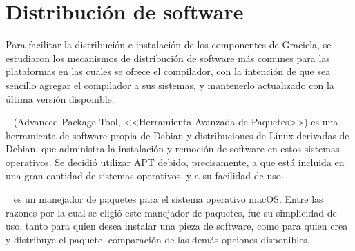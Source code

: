 \section{Distribución de software}

Para facilitar la distribución e instalación de los componentes de Graciela, se
estudiaron los mecanismos de distribución de software más comunes para las
plataformas en las cuales se ofrece el compilador, con la intención de que sea
sencillo agregar el compilador a sus sistemas, y mantenerlo actualizado con la
última versión disponible.

\begin{description}[leftmargin=!,labelwidth=\widthof{\bfseries Homebrew}]

\item [APT]~\cite{apt} (Advanced Package Tool, <<Herramienta Avanzada de
Paquetes>>) es una herramienta de software propia de Debian y distribuciones de
Linux derivadas de Debian, que administra la instalación y remoción de software
en estos sistemas operativos. Se decidió utilizar APT debido, precisamente, a
que está incluida en una gran cantidad de sistemas operativos, y a su facilidad
de uso.

\item [Homebrew]~\cite{brew} es un manejador de paquetes para el sistema
operativo macOS. Entre las razones por la cual se eligió este manejador de
paquetes, fue su simplicidad de uso, tanto para quien desea instalar una pieza
de software, como para quien crea y distribuye el paquete, comparación de las
demás opciones disponibles.

\end{description}
